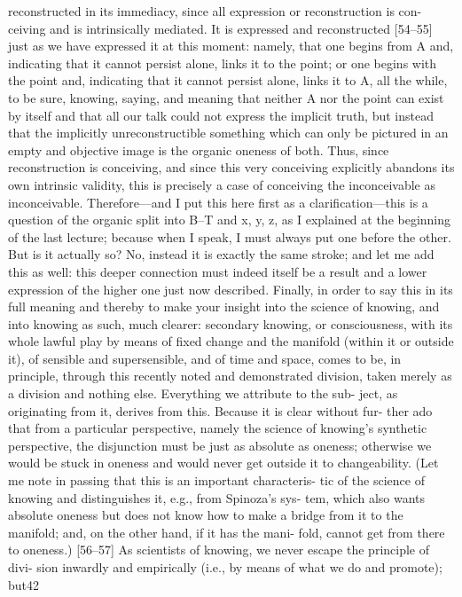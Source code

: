 reconstructed in its immediacy, since all expression or reconstruction is con-
ceiving and is intrinsically mediated. It is expressed and reconstructed
[54–55] just as we have expressed it at this moment: namely, that one begins
from A and, indicating that it cannot persist alone, links it to the point; or
one begins with the point and, indicating that it cannot persist alone, links
it to A, all the while, to be sure, knowing, saying, and meaning that neither
A nor the point can exist by itself and that all our talk could not express the
implicit truth, but instead that the implicitly unreconstructible something
which can only be pictured in an empty and objective image is the organic
oneness of both. Thus, since reconstruction is conceiving, and since this very
conceiving explicitly abandons its own intrinsic validity, this is precisely a
case of conceiving the inconceivable as inconceivable. Therefore—and I put
this here first as a clarification—this is a question of the organic split into
B–T and x, y, z, as I explained at the beginning of the last lecture; because
when I speak, I must always put one before the other. But is it actually so?
No, instead it is exactly the same stroke; and let me add this as well: this
deeper connection must indeed itself be a result and a lower expression of the
higher one just now described. Finally, in order to say this in its full meaning
and thereby to make your insight into the science of knowing, and into
knowing as such, much clearer: secondary knowing, or consciousness, with its
whole lawful play by means of fixed change and the manifold (within it or
outside it), of sensible and supersensible, and of time and space, comes to be,
in principle, through this recently noted and demonstrated division, taken
merely as a division and nothing else. Everything we attribute to the sub-
ject, as originating from it, derives from this. Because it is clear without fur-
ther ado that from a particular perspective, namely the science of knowing’s
synthetic perspective, the disjunction must be just as absolute as oneness;
otherwise we would be stuck in oneness and would never get outside it to
changeability. (Let me note in passing that this is an important characteris-
tic of the science of knowing and distinguishes it, e.g., from Spinoza’s sys-
tem, which also wants absolute oneness but does not know how to make a
bridge from it to the manifold; and, on the other hand, if it has the mani-
fold, cannot get from there to oneness.)
[56–57] As scientists of knowing, we never escape the principle of divi-
sion inwardly and empirically (i.e., by means of what we do and promote); but42

